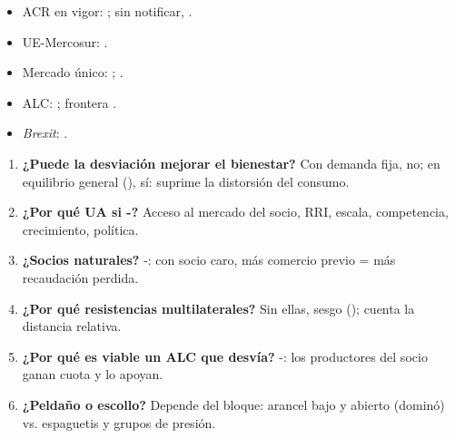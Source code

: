 \documentclass{article}
\begin{document}
\begin{columnas}
\anexorepaso
{}
\begin{itemize}
\item ACR en vigor: ; sin notificar, .
\item UE-Mercosur: .
\item Mercado único: ; .
\item ALC: ; frontera .
\item \emph{Brexit}: .
\end{itemize}
\begin{enumerate}
\item \textbf{¿Puede la desviación mejorar el bienestar?} Con demanda fija, no; en equilibrio general (), sí: suprime la distorsión del consumo.
\item \textbf{¿Por qué UA si -?} Acceso al mercado del socio, RRI, escala, competencia, crecimiento, política.
\item \textbf{¿Socios naturales?} -: con socio caro, más comercio previo = más recaudación perdida.
\item \textbf{¿Por qué resistencias multilaterales?} Sin ellas, sesgo (); cuenta la distancia relativa.
\item \textbf{¿Por qué es viable un ALC que desvía?} -: los productores del socio ganan cuota y lo apoyan.
\item \textbf{¿Peldaño o escollo?} Depende del bloque: arancel bajo y abierto (dominó) vs. espaguetis y grupos de presión.
\end{enumerate}
\begin{trampa}
\begin{itemize}

\end{itemize}
\end{trampa}
\end{columnas}
\end{document}

